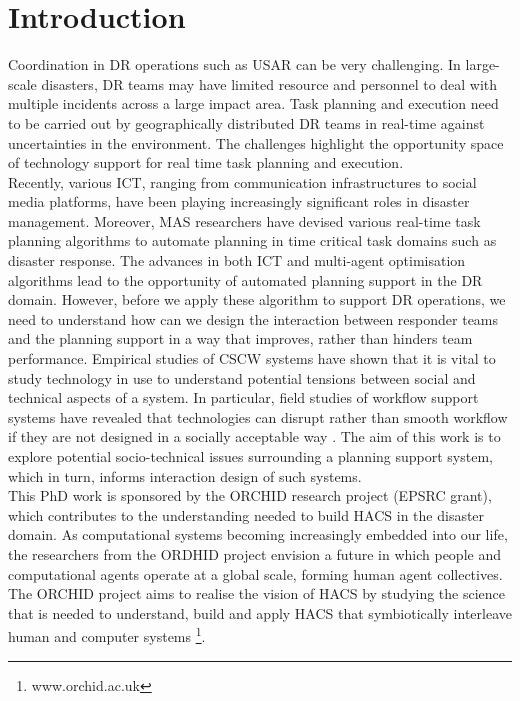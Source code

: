 \chapter{Introduction}\label{ch:introduction}
Coordination in \acf{DR} operations such as \acf{USAR} can be very challenging. In large-scale disasters, \ac{DR} teams may have limited resource and personnel to deal with multiple incidents across a large impact area. Task planning and execution need to be carried out by geographically distributed \ac{DR} teams in real-time against uncertainties in the environment. The challenges highlight the opportunity space of technology support for real time task planning and execution.  \\ 

Recently, various \acf{ICT}, ranging from communication infrastructures to social media platforms, have been playing increasingly significant roles in  disaster management.  Moreover, \acf{MAS} researchers have devised various real-time task planning algorithms to automate planning in time critical task domains such as disaster response. The advances in both \ac{ICT} and multi-agent optimisation algorithms lead to the opportunity of automated planning support in the \ac{DR} domain. However, before we apply these algorithm to support \ac{DR} operations, we need to understand how can we design the interaction between responder teams and the planning support in a way that improves, rather than hinders team performance. Empirical studies of \acf{CSCW} systems have shown that it is vital to study technology in use to understand potential tensions between social and technical aspects of a system. In particular, field studies of workflow support systems have revealed that technologies can disrupt rather than smooth workflow if they are not designed in a socially acceptable way \cite{Bowers1994}. The aim of this work is to explore potential socio-technical issues surrounding a planning support system, which in turn, informs interaction design of such systems. \\

This PhD work is sponsored by the ORCHID research project (EPSRC grant), which contributes to the understanding needed to build \acf{HACS} in the disaster domain. As computational systems  becoming increasingly embedded into our life, the researchers from the ORDHID project envision a future in which people and computational agents operate at a global scale, forming human agent collectives. The ORCHID project aims to realise the vision of \ac{HACS} by studying the science that is needed to understand, build and apply \ac{HACS} that symbiotically interleave human and computer systems \footnote{www.orchid.ac.uk}.\\

